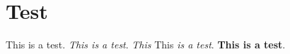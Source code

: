
\chapter{Test}

This is a test.
\textit{This is a test}.
\textit{This}
This \textit{is
a test}.
{\bf This is a test}.

